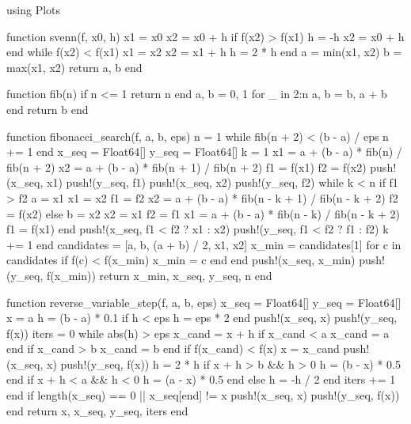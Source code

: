 \documentclass[a4paper, 14pt]{extarticle}
\begin{document}
\begin{breakablelisting}
using Plots

function svenn(f, x0, h)
    x1 = x0
    x2 = x0 + h
    if f(x2) > f(x1)
        h = -h
        x2 = x0 + h
    end
    while f(x2) < f(x1)
        x1 = x2
        x2 = x1 + h
        h = 2 * h
    end
    a = min(x1, x2)
    b = max(x1, x2)
    return a, b
end

function fib(n)
    if n <= 1
        return n
    end
    a, b = 0, 1
    for _ in 2:n
        a, b = b, a + b
    end
    return b
end

function fibonacci_search(f, a, b, eps)
    n = 1
    while fib(n + 2) < (b - a) / eps
        n += 1
    end
    x_seq = Float64[]
    y_seq = Float64[]
    k = 1
    x1 = a + (b - a) * fib(n) / fib(n + 2)
    x2 = a + (b - a) * fib(n + 1) / fib(n + 2)
    f1 = f(x1)
    f2 = f(x2)
    push!(x_seq, x1)
    push!(y_seq, f1)
    push!(x_seq, x2)
    push!(y_seq, f2)
    while k < n
        if f1 > f2
            a = x1
            x1 = x2
            f1 = f2
            x2 = a + (b - a) * fib(n - k + 1) / fib(n - k + 2)
            f2 = f(x2)
        else
            b = x2
            x2 = x1
            f2 = f1
            x1 = a + (b - a) * fib(n - k) / fib(n - k + 2)
            f1 = f(x1)
        end
        push!(x_seq, f1 < f2 ? x1 : x2)
        push!(y_seq, f1 < f2 ? f1 : f2)
        k += 1
    end
    candidates = [a, b, (a + b) / 2, x1, x2]
    x_min = candidates[1]
    for c in candidates
        if f(c) < f(x_min)
            x_min = c
        end
    end
    push!(x_seq, x_min)
    push!(y_seq, f(x_min))
    return x_min, x_seq, y_seq, n
end

function reverse_variable_step(f, a, b, eps)
    x_seq = Float64[]
    y_seq = Float64[]
    x = a
    h = (b - a) * 0.1
    if h < eps
        h = eps * 2
    end
    push!(x_seq, x)
    push!(y_seq, f(x))
    iters = 0
    while abs(h) > eps
        x_cand = x + h
        if x_cand < a
            x_cand = a
        end
        if x_cand > b
            x_cand = b
        end
        if f(x_cand) < f(x)
            x = x_cand
            push!(x_seq, x)
            push!(y_seq, f(x))
            h = 2 * h
            if x + h > b && h > 0
                h = (b - x) * 0.5
            end
            if x + h < a && h < 0
                h = (a - x) * 0.5
            end
        else
            h = -h / 2
        end
        iters += 1
    end
    if length(x_seq) == 0 || x_seq[end] != x
        push!(x_seq, x)
        push!(y_seq, f(x))
    end
    return x, x_seq, y_seq, iters
end


\end{breakablelisting}
\end{document}
